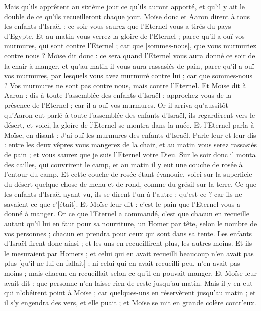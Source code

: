 \begin{multicols}{2}
Mais qu'ils apprêtent au sixième jour ce qu'ils auront apporté, et qu'il y ait le double de ce qu'ils recueilleront chaque jour.
Moïse donc et Aaron dirent à tous les enfants d'Israël : ce soir vous saurez que l'Eternel vous a tirés du pays d'Egypte.
Et au matin vous verrez la gloire de l'Eternel ; parce qu'il a ouï vos murmures, qui sont contre l'Eternel ; car que [sommes-nous], que vous murmuriez contre nous ?
Moïse dit donc : ce sera quand l'Eternel vous aura donné ce soir de la chair à manger, et qu'au matin il vous aura rassasiés de pain, parce qu'il a ouï vos murmures, par lesquels vous avez murmuré contre lui ; car que sommes-nous ? Vos murmures ne sont pas contre nous, mais contre l'Eternel.
Et Moïse dit à Aaron : dis à toute l'assemblée des enfants d'Israël : approchez-vous de la présence de l'Eternel ; car il a ouï vos murmures.
Or il arriva qu'aussitôt qu'Aaron eut parlé à toute l'assemblée des enfants d'Israël, ils regardèrent vers le désert, et voici, la gloire de l'Eternel se montra dans la nuée.
Et l'Eternel parla à Moïse, en disant :
J'ai ouï les murmures des enfants d'Israël. Parle-leur et leur dis : entre les deux vêpres vous mangerez de la chair, et au matin vous serez rassasiés de pain ; et vous saurez que je suis l'Eternel votre Dieu.
Sur le soir donc il monta des cailles, qui couvrirent le camp, et au matin il y eut une couche de rosée à l'entour du camp.
Et cette couche de rosée étant évanouie, voici sur la superficie du désert quelque chose de menu et de rond, comme du grésil sur la terre.
Ce que les enfants d'Israël ayant vu, ils se dirent l'un à l'autre : qu'est-ce ? car ils ne savaient ce que c'[était]. Et Moïse leur dit : c'est le pain que l'Eternel vous a donné à manger.
Or ce que l'Eternel a commandé, c'est que chacun en recueille autant qu'il lui en faut pour sa nourriture, un Homer par tête, selon le nombre de vos personnes ; chacun en prendra pour ceux qui sont dans sa tente.
Les enfants d'Israël firent donc ainsi ; et les uns en recueillirent plus, les autres moins.
Et ils le mesuraient par Homers ; et celui qui en avait recueilli beaucoup n'en avait pas plus [qu'il ne lui en fallait] ; ni celui qui en avait recueilli peu, n'en avait pas moins ; mais chacun en recueillait selon ce qu'il en pouvait manger.
Et Moïse leur avait dit : que personne n'en laisse rien de reste jusqu'au matin.
Mais il y en eut qui n'obéirent point à Moïse ; car quelques-uns en réservèrent jusqu'au matin ; et il s'y engendra des vers, et elle puait ; et Moïse se mit en grande colère contr’eux.

\end{multicols}
